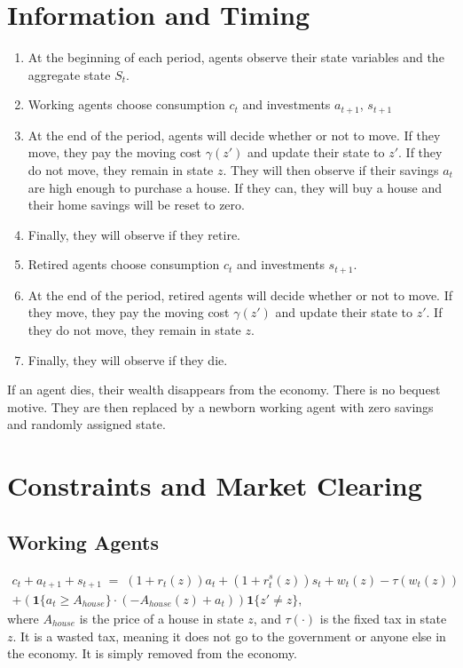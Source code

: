 \documentclass[12pt]{article}
\theoremstyle{remark}
\newcommand{\1}{\mathbf{1}}
\begin{document}
\begin{itemize}[leftmargin=1.2em]
\begin{enumerate}
\section{Information and Timing}
\begin{enumerate}[leftmargin=1.2em]
  \item At the beginning of each period, agents observe their state variables and the aggregate state $S_t$.
  \item Working agents choose consumption $c_t$ and investments $a_{t+1}$, $s_{t+1}$
  \item At the end of the period, agents will decide whether or not to move. If they move, they pay the moving cost $\gamma(z')$ and update their state to $z'$. 
  If they do not move, they remain in state $z$. They will then observe if their savings $a_t$ are high enough to purchase a house. If they can, they 
  will buy a house and their home savings will be reset to zero.
  \item Finally, they will observe if they retire.
  \item Retired agents choose consumption $c_t$ and investments $s_{t+1}$.
  \item At the end of the period, retired agents will decide whether or not to move. If they move, they pay the moving cost $\gamma(z')$ and update their state to $z'$. 
  If they do not move, they remain in state $z$. 
  \item Finally, they will observe if they die.
\end{enumerate}

If an agent dies, their wealth disappears from the economy. There is no bequest motive. They are then replaced by a newborn working agent with zero savings and randomly assigned state.

\section{Constraints and Market Clearing}
    \subsection{Working Agents}
      \begin{align}
        c_t + a_{t+1} + s_{t+1} \;=\; (1+r_t(z))a_t + (1+r^s_t(z))s_t + w_t(z) - \tau(w_t(z)) \\
        + (\1\{a_t \geq A_{house}\} \cdot (-A_{house}(z) + a_t))\1\{z' \ne z\},
      \end{align}
          where $A_{house}$ is the price of a house in state $z$, and $\tau(\cdot)$ is the fixed tax in state $z$. It is a 
          wasted tax, meaning it does not go to the government or anyone else in the economy. It is simply removed from the economy.


\end{enumerate}
\end{itemize}
\end{document}
